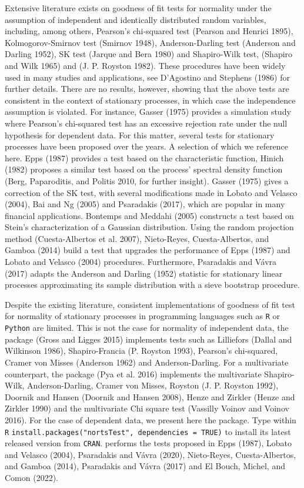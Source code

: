 Extensive literature exists on goodness of fit tests for normality under the assumption of independent and identically distributed random variables, including, among others, Pearson's chi-squared test (Pearson and Henrici 1895), Kolmogorov-Smirnov test (Smirnov 1948), Anderson-Darling test (Anderson and Darling 1952), SK test (Jarque and Bera 1980) and Shapiro-Wilk test, (Shapiro and Wilk 1965) and (J. P. Royston 1982). These procedures have been widely used in many studies and applications, see D'Agostino and Stephens (1986) for further details. There are no results, however, showing that the above tests are consistent in the context of stationary processes, in which case the independence assumption is violated. For instance, Gasser (1975) provides a simulation study where Pearson's chi-squared test has an excessive rejection rate under the null hypothesis for dependent data. For this matter, several tests for stationary processes have been proposed over the years. A selection of which we reference here. Epps (1987) provides a test based on the characteristic function, Hinich (1982) proposes a similar test based on the process' spectral density function (Berg, Paparoditis, and Politis 2010, for further insight). Gasser (1975) gives a correction of the SK test, with several modifications made in Lobato and Velasco (2004), Bai and Ng (2005) and Psaradakis (2017), which are popular in many financial applications. Bontemps and Meddahi (2005) constructs a test based on Stein's characterization of a Gaussian distribution. Using the random projection method (Cuesta-Albertos et al. 2007), Nieto-Reyes, Cuesta-Albertos, and Gamboa (2014) build a test that upgrades the performance of Epps (1987) and Lobato and Velasco (2004) procedures. Furthermore, Psaradakis and Vávra (2017) adapts the Anderson and Darling (1952) statistic for stationary linear processes approximating its sample distribution with a sieve bootstrap procedure.

Despite the existing literature, consistent implementations of goodness of fit test for normality of stationary processes in programming languages such as \texttt{R} or \texttt{Python} are limited. This is not the case for normality of independent data, the  package (Gross and Ligges 2015) implements tests such as Lilliefors (Dallal and Wilkinson 1986), Shapiro-Francia (P. Royston 1993), Pearson's chi-squared, Cramer von Misses (Anderson 1962) and Anderson-Darling. For a multivariate counterpart, the  package (Pya et al. 2016) implements the multivariate Shapiro-Wilk, Anderson-Darling, Cramer von Misses, Royston (J. P. Royston 1992), Doornik and Hansen (Doornik and Hansen 2008), Henze and Zirkler (Henze and Zirkler 1990) and the multivariate Chi square test (Vassilly Voinov and Voinov 2016). For the case of dependent data, we present here the  package. Type within \texttt{R} \texttt{install.packages("nortsTest",\ dependencies\ =\ TRUE)} to install its latest released version from \texttt{CRAN}.  performs the tests proposed in Epps (1987), Lobato and Velasco (2004), Psaradakis and Vávra (2020), Nieto-Reyes, Cuesta-Albertos, and Gamboa (2014), Psaradakis and Vávra (2017) and El Bouch, Michel, and Comon (2022).

